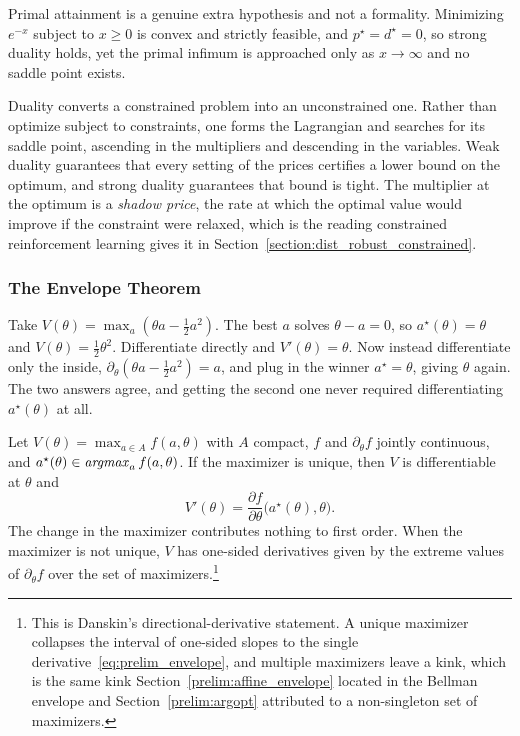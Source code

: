 Primal attainment is a genuine extra hypothesis and not a formality. Minimizing $e^{-x}$ subject to $x \geq 0$ is convex and strictly feasible, and $p^\star = d^\star = 0$, so strong duality holds, yet the primal infimum is approached only as $x \to \infty$ and no saddle point exists.

Duality converts a constrained problem into an unconstrained one. Rather than optimize subject to constraints, one forms the Lagrangian and searches for its saddle point, ascending in the multipliers and descending in the variables. Weak duality guarantees that every setting of the prices certifies a lower bound on the optimum, and strong duality guarantees that bound is tight. The multiplier at the optimum is a \emph{shadow price}, the rate at which the optimal value would improve if the constraint were relaxed, which is the reading constrained reinforcement learning gives it in Section~\ref{section:dist_robust_constrained}.

\subsubsection{The Envelope Theorem}

Take $V(\theta) = \max_a (\theta a - \tfrac{1}{2}a^2)$. The best $a$ solves $\theta - a = 0$, so $a^\star(\theta) = \theta$ and $V(\theta) = \tfrac{1}{2}\theta^2$. Differentiate directly and $V'(\theta) = \theta$. Now instead differentiate only the inside, $\partial_\theta(\theta a - \tfrac{1}{2}a^2) = a$, and plug in the winner $a^\star = \theta$, giving $\theta$ again. The two answers agree, and getting the second one never required differentiating $a^\star(\theta)$ at all.

\begin{theorem}
\label{thm:prelim_envelope}
Let $V(\theta) = \max_{a \in A} f(a, \theta)$ with $A$ compact, $f$ and $\partial_\theta f$ jointly continuous, and $a^\star(\theta) \in \mathop{\it argmax}_a f(a, \theta)$. If the maximizer is unique, then $V$ is differentiable at $\theta$ and
\begin{equation}
V'(\theta) = \frac{\partial f}{\partial \theta}\bigl(a^\star(\theta), \theta\bigr).
\label{eq:prelim_envelope}
\end{equation}
The change in the maximizer contributes nothing to first order. When the maximizer is not unique, $V$ has one-sided derivatives given by the extreme values of $\partial_\theta f$ over the set of maximizers.\footnote{This is Danskin's directional-derivative statement. A unique maximizer collapses the interval of one-sided slopes to the single derivative~\eqref{eq:prelim_envelope}, and multiple maximizers leave a kink, which is the same kink Section~\ref{prelim:affine_envelope} located in the Bellman envelope and Section~\ref{prelim:argopt} attributed to a non-singleton set of maximizers.}
\end{theorem}

